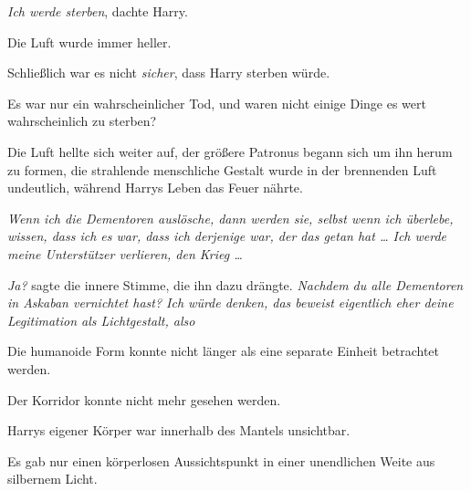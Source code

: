 \emph{Ich werde sterben}, dachte Harry.

Die Luft wurde immer heller.

Schließlich war es nicht \emph{sicher}, dass Harry sterben würde.

Es war nur ein wahrscheinlicher Tod, und waren nicht einige Dinge es wert wahrscheinlich zu sterben?

Die Luft hellte sich weiter auf, der größere Patronus begann sich um ihn herum zu formen, die strahlende menschliche Gestalt wurde in der brennenden Luft undeutlich, während Harrys Leben das Feuer nährte.

\emph{Wenn ich die Dementoren auslösche, dann werden sie, selbst wenn ich überlebe, wissen, dass ich es war, dass ich derjenige war, der das getan hat … Ich werde meine Unterstützer verlieren, den Krieg …}

\emph{Ja?} sagte die innere Stimme, die ihn dazu drängte. \emph{Nachdem du alle Dementoren in Askaban vernichtet hast? Ich würde denken, das beweist eigentlich eher deine Legitimation als Lichtgestalt, also }

Die humanoide Form konnte nicht länger als eine separate Einheit betrachtet werden.

Der Korridor konnte nicht mehr gesehen werden.

Harrys eigener Körper war innerhalb des Mantels unsichtbar.

Es gab nur einen körperlosen Aussichtspunkt in einer unendlichen Weite aus silbernem Licht.

